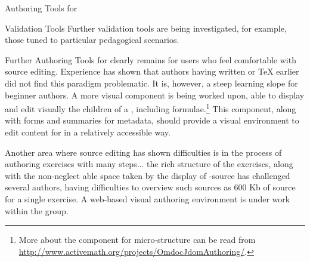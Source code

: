 \begin{omgroup}[id=jeditoqmath,creators=libbrecht]{Authoring Tools for {\activemath}}
\begin{omgroup}{Validation Tools}
Further validation tools are being investigated, for example, those tuned to particular
pedagogical scenarios.
\end{omgroup}

\begin{omgroup}{Further Authoring Tools for {\activemath}}
  {} clearly remains for users who feel comfortable with source
  editing. Experience has shown that authors having written {\html} or {\TeX} earlier did
  not find this paradigm problematic.  It is, however, a steep learning slope for beginner
  authors.  A more visual component is being worked upon, able to display and edit
  visually the children of a , including formulae.\footnote{More about the
    component for {\omdoc} micro-structure can be read from
    \url{http://www.activemath.org/projects/OmdocJdomAuthoring/}.}  This component, along
  with forms and summaries for metadata, should provide a visual environment to edit
  {\omdoc} content for {\activemath} in a relatively accessible way.

Another area where source editing has shown difficulties is in the process of authoring
exercises with many steps... the rich structure of the exercises, along with the non-neglect able
space taken by the display of {\xml}-source has challenged several authors, having
difficulties to overview such sources as 600 Kb of {} source for a single
exercise. 
A web-based visual authoring environment is under work within the {\activemath} group.
\end{omgroup}
\end{omgroup}

